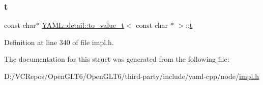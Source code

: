 \subsubsection{\texorpdfstring{t}{t}}
{\footnotesize\ttfamily const char$\ast$ \mbox{\hyperlink{struct_y_a_m_l_1_1detail_1_1to__value__t}{Y\+A\+M\+L\+::detail\+::to\+\_\+value\+\_\+t}}$<$ const char $\ast$ $>$\+::\mbox{\hyperlink{glad_8h_aef9f00bf06d58b8db7e501e287488401}{t}}}



Definition at line 340 of file impl.\+h.



The documentation for this struct was generated from the following file\+:\begin{DoxyCompactItemize}
\item 
D\+:/\+V\+C\+Repos/\+Open\+G\+L\+T6/\+Open\+G\+L\+T6/third-\/party/include/yaml-\/cpp/node/\mbox{\hyperlink{impl_8h}{impl.\+h}}\end{DoxyCompactItemize}
